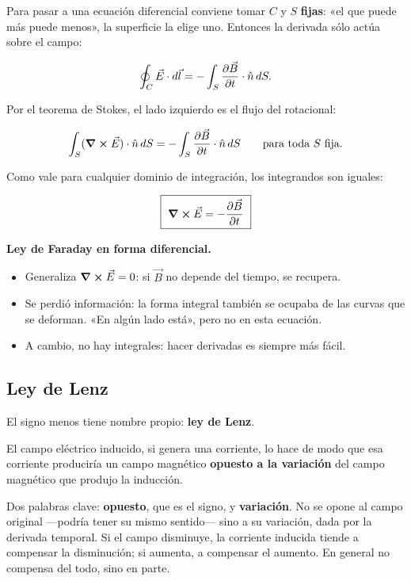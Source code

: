 \documentclass[12pt,a4paper]{article}
\begin{document}
Para pasar a una ecuación diferencial conviene tomar $C$ y $S$ \textbf{fijas}: «el
que puede más puede menos», la superficie la elige uno. Entonces la derivada
sólo actúa sobre el campo:

\[
\oint_C \vec E\cdot d\vec l = -\int_S \pdv{\vec B}{t}\cdot\hat n\,dS .
\]

Por el teorema de Stokes, el lado izquierdo es el flujo del rotacional:

\[
\int_S (\curl\vec E)\cdot\hat n\,dS = -\int_S \pdv{\vec B}{t}\cdot\hat n\,dS
\qquad\text{para toda } S \text{ fija}.
\]

Como vale para cualquier dominio de integración, los integrandos son iguales:

\begin{keybox}
\[
\boxed{\ \curl\vec E = -\pdv{\vec B}{t}\ }
\]
\end{keybox}

\textbf{Ley de Faraday en forma diferencial.}

\begin{itemize}
  \item Generaliza $\curl\vec E = 0$: si $\vec B$ no depende del tiempo, se recupera.
  \item Se perdió información: la forma integral también se ocupaba de las curvas que
  se deforman. «En algún lado está», pero no en esta ecuación.
  \item A cambio, no hay integrales: hacer derivadas es siempre más fácil.
\end{itemize}

\subsection{Ley de Lenz}

El signo menos tiene nombre propio: \textbf{ley de Lenz}.

\begin{notebox}
El campo eléctrico inducido, si genera una corriente, lo hace de modo que esa
corriente produciría un campo magnético \textbf{opuesto a la variación} del campo
magnético que produjo la inducción.
\end{notebox}

Dos palabras clave: \textbf{opuesto}, que es el signo, y \textbf{variación}. No se opone
al campo original ---podría tener su mismo sentido--- sino a su variación, dada por
la derivada temporal. Si el campo disminuye, la corriente inducida tiende a
compensar la disminución; si aumenta, a compensar el aumento. En general no
compensa del todo, sino en parte.
\end{document}
